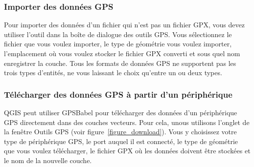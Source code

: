 \subsubsection{Importer des données GPS}

Pour importer des données d'un fichier qui n'est pas un fichier GPX, vous devez utiliser l'outil  dans la boîte de dialogue des outils GPS. Vous sélectionnez le fichier que vous voulez importer, le type de géométrie vous voulez importer, l'emplacement où vous voulez stocker le fichier GPX converti et sous quel nom enregistrer la couche. Tous les formats de données GPS ne supportent pas les trois types d'entités, ne vous laissant le choix qu'entre un ou deux types.

\subsubsection{Télécharger des données GPS à partir d'un périphérique}


QGIS peut utiliser GPSBabel pour télécharger des données d'un périphérique GPS directement dans des couches vecteurs.
Pour cela, unous utilisons l'onglet  de la fenêtre Outils GPS (voir figure~\ref{figure_download}). Vous y choisissez votre type de périphérique GPS, le port auquel il est connecté, le type de géométrie que vous voulez télécharger, le fichier GPX où les données doivent être stockées et le nom de la nouvelle couche.

